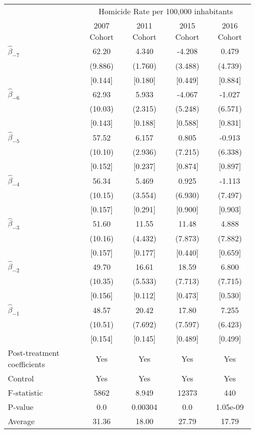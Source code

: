 \documentclass[]{article}
\begin{document}
\begin{table}[htbp]
\centering
\begin{tabular}{lcccc}
\toprule
& \multicolumn{4}{c}{Homicide Rate per 100,000 inhabitants} \\
\cmidrule(lr){2-5}
& 2007 Cohort & 2011 Cohort & 2015 Cohort & 2016 Cohort \\
\midrule
$\hat{\beta}_{-7}$ & 62.20 & 4.340 & -4.208 & 0.479 \\
& (9.886) & (1.760) & (3.488) & (4.739) \\
& [0.144] & [0.180] & [0.449] & [0.884] \\
[1ex]
$\hat{\beta}_{-6}$ & 62.93 & 5.933 & -4.067 & -1.027 \\
& (10.03) & (2.315) & (5.248) & (6.571) \\
& [0.143] & [0.188] & [0.588] & [0.831] \\
[1ex]
$\hat{\beta}_{-5}$ & 57.52 & 6.157 & 0.805 & -0.913 \\
& (10.10) & (2.936) & (7.215) & (6.338) \\
& [0.152] & [0.237] & [0.874] & [0.897] \\
[1ex]
$\hat{\beta}_{-4}$ & 56.34 & 5.469 & 0.925 & -1.113 \\
& (10.15) & (3.554) & (6.930) & (7.497) \\
& [0.157] & [0.291] & [0.900] & [0.903] \\
[1ex]
$\hat{\beta}_{-3}$ & 51.60 & 11.55 & 11.48 & 4.888 \\
& (10.16) & (4.432) & (7.873) & (7.882) \\
& [0.157] & [0.177] & [0.440] & [0.659] \\
[1ex]
$\hat{\beta}_{-2}$ & 49.70 & 16.61 & 18.59 & 6.800 \\
& (10.35) & (5.533) & (7.713) & (7.715) \\
& [0.156] & [0.112] & [0.473] & [0.530] \\
[1ex]
$\hat{\beta}_{-1}$ & 48.57 & 20.42 & 17.80 & 7.255 \\
& (10.51) & (7.692) & (7.597) & (6.423) \\
& [0.154] & [0.145] & [0.489] & [0.499] \\
[1ex]
Post-treatment coefficients & Yes & Yes & Yes & Yes \\
Control & Yes & Yes & Yes & Yes \\
\midrule
F-statistic & 5862 & 8.949 & 12373 & 440 \\
P-value & 0.0 & 0.00304 & 0.0 & 1.05e-09 \\
Average & 31.36 & 18.00 & 27.79 & 17.79 \\
\bottomrule
\end{tabular}
\end{table}
\end{document}
